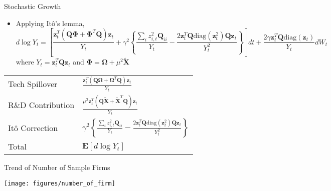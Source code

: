 \documentclass[
  10pt,               %
  aspectratio=169,     %
]{beamer}
\theoremstyle{plain}
\begin{document}
\begin{frame}{Stochastic Growth}

  \label{Y_process}
  \begin{itemize}
    \item Applying Itô's lemma, {\footnotesize
          \[
            d\log Y_{t}=\left[\frac{\bm{z}_{t}^{T}\left(\bm{Q}\bm{\Phi}+\bm{\Phi}^{T}\bm{Q}\right)\bm{z}_{t}}{Y_{t}}+\gamma^{2}\left\{ \frac{\sum_{i}z_{i,t}^{2}\bm{Q}_{ii}}{Y_{t}}-\frac{2\bm{z}_{t}^{T}\bm{Q}\mathrm{diag}\left(\bm{z}_{t}^{2}\right)\bm{Q}\bm{z}_{t}}{Y_{t}^{2}}\right\} \right]dt+\frac{2\gamma\bm{z}_{t}^{T}\bm{Q}\mathrm{diag}\left(\bm{z}_{t}\right)}{Y_{t}}dW_{t}
          \]
          }where $Y_{t}=\bm{z}_{t}^{T}\bm{Q}\bm{z}_{t}$ and $\bm{\Phi}=\bm{\Omega}+\mu^{2}\bm{\widetilde{X}}$
  \end{itemize}
  \begin{center}
    \begin{tabular}{l l}
      \toprule
      Tech Spillover    & $\displaystyle \frac{\bm{z}_{t}^{T}\left(\bm{Q}\bm{\Omega}+\bm{\Omega}^{T}\bm{Q}\right)\bm{z}_{t}}{Y_{t}}$                                                                                \\
      R\&D Contribution & $\displaystyle \frac{\mu^{2}\bm{z}_{t}^{T}\left(\bm{Q}\bm{\widetilde{X}}+\bm{\widetilde{X}}^{T}\bm{Q}\right)\bm{z}_{t}}{Y_{t}}$                                                           \\
      Itô Correction    & $\displaystyle \gamma^{2}\left\{ \frac{\sum_{i}z_{i,t}^{2}\bm{Q}_{ii}}{Y_{t}} - \frac{2\bm{z}_{t}^{T}\bm{Q}\mathrm{diag}\left(\bm{z}_{t}^{2}\right)\bm{Q}\bm{z}_{t}}{Y_{t}^{2}} \right\}$ \\
      \midrule
      Total             & $\bm{E}\left[d\log Y_{t}\right]$                                                                                                                                                          \\
      \bottomrule
    \end{tabular}
  \end{center}
\end{frame}
%
\begin{frame}{Trend of Number of Sample Firms}
  \begin{center}
    \texttt{[image: figures/number\_of\_firm]}
    \par\end{center}

\end{frame}
\end{document}
